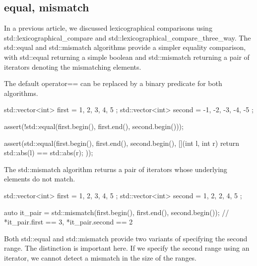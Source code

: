\subsection{equal, mismatch}

In a previous article, we discussed lexicographical comparisons using std::lexicographical\_compare and std::lexicographical\_compare\_three\_way. The std::equal and std::mismatch algorithms provide a simpler equality comparison, with std::equal returning a simple boolean and std::mismatch returning a pair of iterators denoting the mismatching elements.



The default operator== can be replaced by a binary predicate for both algorithms.

\begin{box-note}
\begin{cppcode}
std::vector<int> first = { 1, 2, 3, 4, 5 };
std::vector<int> second = { -1, -2, -3, -4, -5 };

assert(!std::equal(first.begin(), first.end(), second.begin()));

assert(std::equal(first.begin(), first.end(), second.begin(), 
                  [](int l, int r) { return std::abs(l) == std::abs(r); }));
\end{cppcode}
\end{box-note}

The std::mismatch algorithm returns a pair of iterators whose underlying elements do not match.

\begin{box-note}
\begin{cppcode}
std::vector<int> first = { 1, 2, 3, 4, 5 };
std::vector<int> second = { 1, 2, 2, 4, 5 };

auto it_pair = std::mismatch(first.begin(), first.end(), second.begin());
// *it_pair.first == 3, *it_pair.second == 2
\end{cppcode}
\end{box-note}

Both std::equal and std::mismatch provide two variants of specifying the second range. The distinction is important here. If we specify the second range using an iterator, we cannot detect a mismatch in the size of the ranges.


